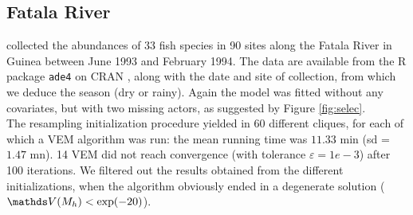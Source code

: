 \subsection{Fatala River}
\cite{baran1995dynamique} collected the abundances of 33 fish species in 90 sites along the Fatala River in Guinea between June 1993 and February 1994. The data are available from the R package \texttt{ade4} on CRAN \citep{dray2007ade4}, along with the date and site of collection, from which we deduce the season (dry or rainy). Again the model was fitted without any covariates, but with two missing actors, as suggested by Figure \ref{fig:selec}. \\
%
The resampling initialization procedure yielded in 60 different cliques, for each of which a VEM algorithm was run: the mean running time was $11.33$ min (sd = $1.47$ mn). 14 VEM did not reach convergence (with tolerance $\varepsilon = 1e-3$) after 100 iterations. We filtered out the results obtained from the different initializations, when the algorithm obviously ended in a degenerate solution ($\Var(M_h) < \exp(-20)$). \\ 
